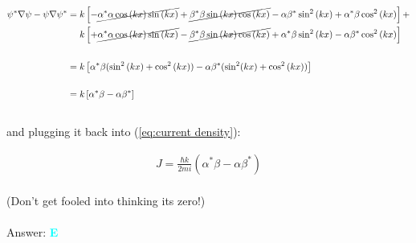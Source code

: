 \documentclass{article}
\begin{document}
\begin{align}
\psi^{*} \nabla \psi - \psi \nabla \psi^{*} =  k &\left[
-\cancel{\alpha^{*} \alpha \cos{(kx)} \sin{(kx)} }
+ \cancel{\beta^{*} \beta \sin{(kx)} \cos{(kx)} }
- \alpha \beta^{*} \sin^{2}{(kx)} 
+ \alpha^{*} \beta \cos^{2}{(kx)}\right] +
\nonumber\\
 k &\left[
+ \cancel{\alpha^{*} \alpha \cos{(kx)} \sin{(kx)} }
- \cancel{\beta^{*} \beta \sin{(kx)} \cos{(kx)} }
+ \alpha^{*} \beta \sin^{2}{(kx)} 
- \alpha \beta^{*} \cos^{2}{(kx)}
\right]\nonumber\\\nonumber\\
= k &\left[ \alpha^{*} \beta (\sin^{2}{(kx) + \cos^{2}{(kx)}}) -  \alpha \beta^{*} (\sin^{2}(kx) + \cos^{2}{(kx))}\right]\nonumber\\\nonumber\\
= k &\left[   \alpha^{*} \beta  -  \alpha \beta^{*}  \right]\nonumber
\end{align}
\\
and plugging it back into (\ref {eq:current density}):

\begin{gather}
J = \boxed{\frac{\hbar k}{2m i} \left(   \alpha^{*} \beta  -  \alpha \beta^{*}  \right)}\nonumber
\end{gather}
\\
(Don't get fooled into thinking its zero!)
\\\\
Answer: \textbf{\textcolor{cyan}E}\\





\end{document}
